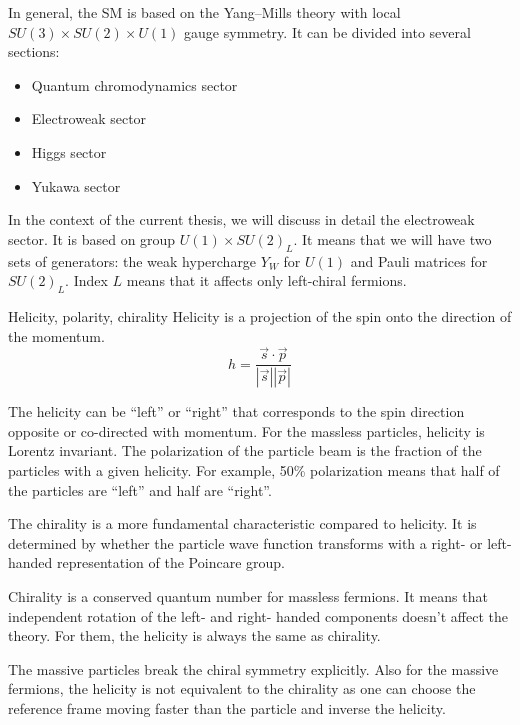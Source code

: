\documentclass[../main.tex]{subfiles}
\begin{document}
In general, the SM is based on the Yang--Mills theory with local $SU(3)\times SU(2)\times U(1)$ gauge symmetry. It can be divided into several sections:
\begin{itemize}
  \item Quantum chromodynamics sector
  \item Electroweak sector
  \item Higgs sector
  \item Yukawa sector
\end{itemize}

In the context of the current thesis, we will discuss in detail the electroweak sector. It is based on group $U(1)\times SU(2)_L$. It means that we will have two sets of generators: the weak hypercharge $Y_W$ for $U(1)$ and Pauli matrices for $SU(2)_L$. Index $L$ means that it affects only left-chiral fermions.

\begin{bclogo}[couleur=blue!2, arrondi=0.1, logo=\bcinfo, nobreak=true]{Helicity, polarity, chirality}
Helicity is a projection of the spin onto the direction of the momentum.
\begin{equation}
h=\frac{\vec{s}\cdot\vec{p}}{\left|\vec{s}\right|\left|\vec{p}\right|}
\end{equation}

The helicity can be ``left'' or ``right'' that corresponds to the spin direction opposite or co-directed with momentum. For the massless particles, helicity is Lorentz invariant. The polarization of the particle beam is the fraction of the particles with a given helicity. For example, 50\% polarization means that half of the particles are ``left'' and half are ``right''.

The chirality is a more fundamental characteristic compared to helicity. It is determined by whether the particle wave function transforms with a right- or left-handed representation of the Poincare group.

Chirality is a conserved quantum number for massless fermions. It means that independent rotation of the left- and right- handed components doesn't affect the theory. For them, the helicity is always the same as chirality.

The massive particles break the chiral symmetry explicitly. Also for the massive fermions, the helicity is not equivalent to the chirality as one can choose the reference frame moving faster than the particle and inverse the helicity.
\end{bclogo}
\end{document}

